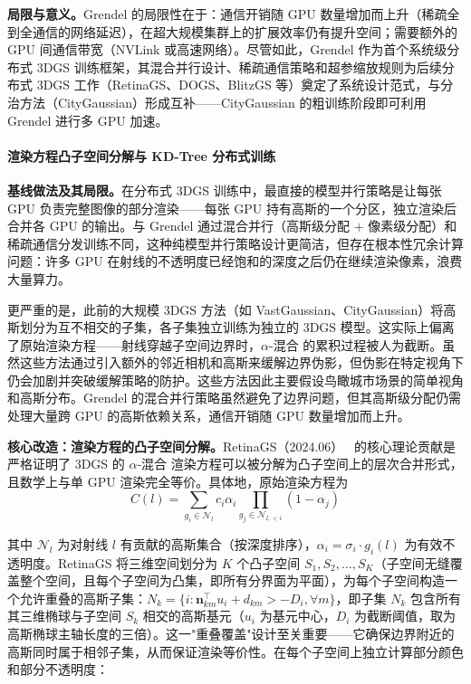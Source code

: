 \textbf{局限与意义。}Grendel 的局限性在于：通信开销随 GPU 数量增加而上升（稀疏全到全通信的网络延迟），在超大规模集群上的扩展效率仍有提升空间；需要额外的 GPU 间通信带宽（NVLink 或高速网络）。尽管如此，Grendel 作为首个系统级分布式 3DGS 训练框架，其混合并行设计、稀疏通信策略和超参缩放规则为后续分布式 3DGS 工作（RetinaGS、DOGS、BlitzGS 等）奠定了系统设计范式，与分治方法（CityGaussian）形成互补——CityGaussian 的粗训练阶段即可利用 Grendel 进行多 GPU 加速。

\paragraph{渲染方程凸子空间分解与 KD-Tree 分布式训练}

\textbf{基线做法及其局限。}在分布式 3DGS 训练中，最直接的模型并行策略是让每张 GPU 负责完整图像的部分渲染——每张 GPU 持有高斯的一个分区，独立渲染后合并各 GPU 的输出。与 Grendel 通过混合并行（高斯级分配 + 像素级分配）和稀疏通信分发训练不同，这种纯模型并行策略设计更简洁，但存在根本性冗余计算问题：许多 GPU 在射线的不透明度已经饱和的深度之后仍在继续渲染像素，浪费大量算力。

更严重的是，此前的大规模 3DGS 方法（如 VastGaussian、CityGaussian）将高斯划分为互不相交的子集，各子集独立训练为独立的 3DGS 模型。这实际上偏离了原始渲染方程——射线穿越子空间边界时，$\alpha$-混合 的累积过程被人为截断。虽然这些方法通过引入额外的邻近相机和高斯来缓解边界伪影，但伪影在特定视角下仍会加剧并突破缓解策略的防护。这些方法因此主要假设鸟瞰城市场景的简单视角和高斯分布。Grendel 的混合并行策略虽然避免了边界问题，但其高斯级分配仍需处理大量跨 GPU 的高斯依赖关系，通信开销随 GPU 数量增加而上升。

\textbf{核心改造：渲染方程的凸子空间分解。}RetinaGS（2024.06）~\cite{2406_11836} 的核心理论贡献是严格证明了 3DGS 的 $\alpha$-混合 渲染方程可以被分解为凸子空间上的层次合并形式，且数学上与单 GPU 渲染完全等价。具体地，原始渲染方程为
\begin{equation}
\label{eq:retinags-original}
C(l) = \sum_{g_i \in \mathcal{N}_l} c_i \alpha_i \prod_{g_j \in \mathcal{N}_{l,<i}}(1-\alpha_j)
\end{equation}

其中 $\mathcal{N}_l$ 为对射线 $l$ 有贡献的高斯集合（按深度排序），$\alpha_i = \sigma_i \cdot g_i(l)$ 为有效不透明度。RetinaGS 将三维空间划分为 $K$ 个凸子空间 $S_1, S_2, \ldots, S_K$（子空间无缝覆盖整个空间，且每个子空间为凸集，即所有分界面为平面），为每个子空间构造一个允许重叠的高斯子集：$N_k = \{i : \mathbf{n}_{km}^\top u_i + d_{km} > -D_i, \forall m\}$，即子集 $N_k$ 包含所有其三维椭球与子空间 $S_k$ 相交的高斯基元（$u_i$ 为基元中心，$D_i$ 为截断阈值，取为高斯椭球主轴长度的三倍）。这一"重叠覆盖"设计至关重要——它确保边界附近的高斯同时属于相邻子集，从而保证渲染等价性。在每个子空间上独立计算部分颜色和部分不透明度：

